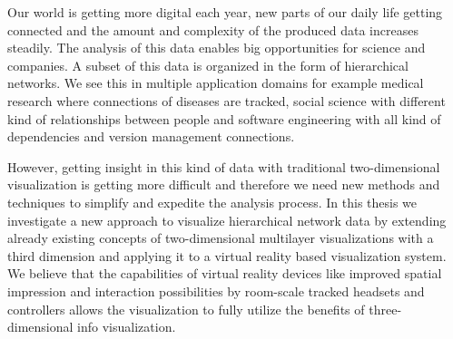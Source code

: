 Our world is getting more digital each year, new parts of our daily life getting connected and the amount and complexity of the produced data increases steadily.
The analysis of this data enables big opportunities for science and companies.
A subset of this data is organized in the form of hierarchical networks. We see this in multiple application domains for example medical research where connections of diseases are tracked, social science with different kind of relationships between people and software engineering with all kind of dependencies and version management connections. 

However, getting insight in this kind of data with traditional two-dimensional visualization is getting more difficult and therefore we need new methods and techniques to simplify and expedite the analysis process.
In this thesis we investigate a new approach to visualize hierarchical network data by extending already existing concepts of two-dimensional multilayer visualizations with a third dimension and applying it to a virtual reality based visualization system. We believe that the capabilities of virtual reality devices like improved spatial impression and interaction possibilities by room-scale tracked headsets and controllers allows the visualization to fully utilize the benefits of three-dimensional info visualization.